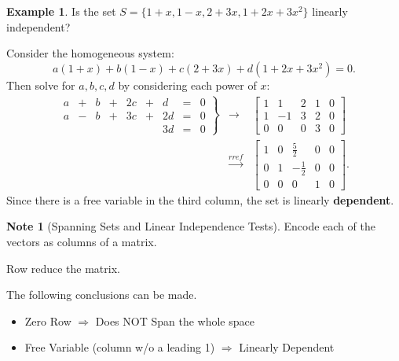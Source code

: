\documentclass{beamer}
\newcommand{\fn}{\insertframenumber}
\theoremstyle{definition}
\newtheorem*{exa}{Example}
\newtheorem*{nb}{Note}
\begin{document}
\begin{frame}{\fn}
\begin{exa}
	Is the set $S=\{1+x,1-x,2+3x,1+2x+3x^2\}$ linearly independent?
	
	Consider the homogeneous system:
	\[a(1+x)+b(1-x)+c(2+3x)+d(1+2x+3x^2)=0.\]
	Then solve for $a,b,c,d$ by considering each power of $x$:
	$$\begin{array}{rcl}\left.\begin{array}{rcrcrcrcl}
	a&+&b&+&2c&+&d&=&0\\
	a&-&b&+&3c&+&2d&=&0\\
	&&&&&&3d&=&0
	\end{array}\right\}&\rightarrow&
	\begin{bmatrix}
	1 & 1 & 2 & 1 & 0 \\
	1 & -1 & 3 & 2 & 0 \\
	0 & 0 & 0 & 3 & 0
	\end{bmatrix}
	\\&\xrightarrow{rref}&
	\begin{bmatrix}
	1 & 0 & \frac{5}{2} & 0 & 0 \\
	0 & 1 & -\frac{1}{2} & 0 & 0 \\
	0 & 0 & 0 & 1 & 0
	\end{bmatrix}.
	\end{array}$$
	Since there is a free variable in the third column, the set is linearly \textbf{dependent}.
\end{exa}
\end{frame}
\begin{frame}{\fn}
\begin{nb}[Spanning Sets and Linear Independence Tests]
	Encode each of the vectors as columns of a matrix.
	
	Row reduce the matrix.
	
	The following conclusions can be made.
	\begin{itemize}[label=--]
		\item Zero Row $\Rightarrow$ Does NOT Span the whole space
		\item Free Variable (column w/o a leading 1) $\Rightarrow$ Linearly Dependent
	\end{itemize}
\end{nb}
\end{frame}
\end{document}
